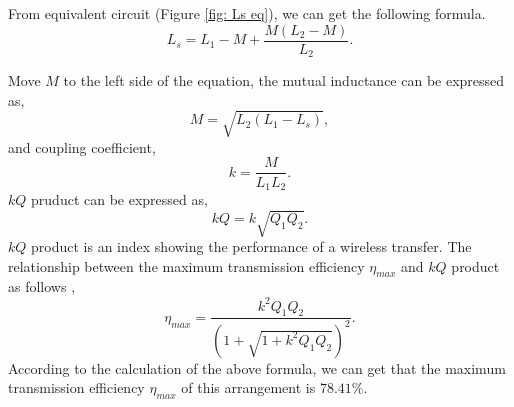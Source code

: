 From equivalent circuit (Figure \ref{fig: Ls eq}), we can get the following formula.
\begin{equation}
    L_s = L_1 - M + \frac{M(L_2 - M)}{L_2}.
\end{equation}

Move $M$ to the left side of the equation, the mutual inductance can be expressed as,
\begin{equation}
    M = \sqrt{L_2(L_1-L_s)},
\end{equation}
and coupling coefficient,
\begin{equation}
    k = \frac{M}{L_1L_2}.
\end{equation}
$kQ$ pruduct can be expressed as,
\begin{equation}
    kQ = k\sqrt{Q_1Q_2}.
\end{equation}
$kQ$ product is an index showing the performance of a wireless transfer. The relationship between the maximum transmission efficiency $\eta_{max}$ and $kQ$ product as follows \cite{Li2015, Ohira2014},
\begin{equation}
    \eta_{max} = \frac{k^2Q_1Q_2}{(1+\sqrt{1+k^2Q_1Q_2})^2}.
\end{equation}
According to the calculation of the above formula, we can get that the maximum transmission efficiency $\eta_{max}$ of this arrangement is $78.41\%$.

